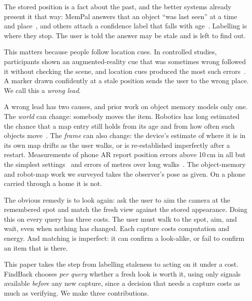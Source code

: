 \documentclass[sigconf,10pt]{acmart}
\newcommand{\sys}{FindBack}
\begin{document}
The stored position is a fact about the past, and the better systems already present it that way:
MemPal answers that an object ``was last seen'' at a time and place~\cite{maniar2025mempal}, and
others attach a confidence label that falls with age~\cite{xie2026linguistic}.
Labelling is where they stop.
The user is told the answer may be stale and is left to find out.

This matters because people follow location cues.
In controlled studies, participants shown an augmented-reality cue that was sometimes wrong
followed it without checking the scene, and location cues produced the most such
errors~\cite{warden2023fast,raikwar2024beyond}.
A marker drawn confidently at a stale position sends the user to the wrong place.
We call this a \emph{wrong lead}.

A wrong lead has two causes, and prior work on object memory models only one.
The \emph{world} can change: somebody moves the item.
Robotics has long estimated the chance that a map entry still holds from its age and from how
often such objects move~\cite{rosen2016towards,toris2017temporal,bogenberger2026glasses}.
The \emph{frame} can also change: the device's estimate of where it is in its own map drifts as
the user walks, or is re-established imperfectly after a restart.
Measurements of phone AR report position errors above 10\,cm in all but the simplest
settings~\cite{scargill2022here} and errors of metres over long walks~\cite{feigl2020localization}.
The object-memory and robot-map work we surveyed takes the observer's pose as given.
On a phone carried through a home it is not.

The obvious remedy is to look again: ask the user to aim the camera at the remembered spot and
match the fresh view against the stored appearance.
Doing this on every query has three costs.
The user must walk to the spot, aim, and wait, even when nothing has changed.
Each capture costs computation and energy.
And matching is imperfect: it can confirm a look-alike, or fail to confirm an item that is there.

This paper takes the step from labelling staleness to acting on it under a cost.
\sys{} chooses \emph{per query} whether a fresh look is worth it, using only signals available
\emph{before} any new capture, since a decision that needs a capture costs as much as verifying.
We make three contributions.
\end{document}
